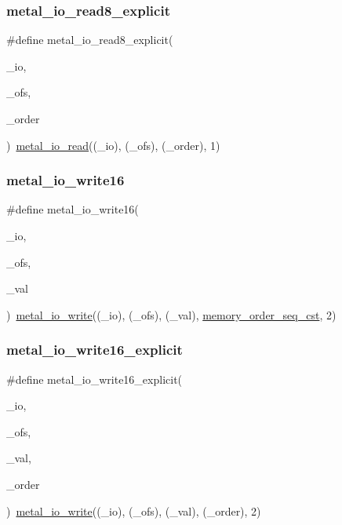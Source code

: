 \subsubsection{\texorpdfstring{metal\+\_\+io\+\_\+read8\+\_\+explicit}{metal\_io\_read8\_explicit}}
{\footnotesize\ttfamily \#define metal\+\_\+io\+\_\+read8\+\_\+explicit(\begin{DoxyParamCaption}\item[{}]{\+\_\+io,  }\item[{}]{\+\_\+ofs,  }\item[{}]{\+\_\+order }\end{DoxyParamCaption})~\hyperlink{group__io_ga0cd8707fcac0d892726f1e946186c531}{metal\+\_\+io\+\_\+read}((\+\_\+io), (\+\_\+ofs), (\+\_\+order), 1)}

\mbox{\label{group__io_gab8016df69fa1998ac33c21a80e59c877}} 
\subsubsection{\texorpdfstring{metal\+\_\+io\+\_\+write16}{metal\_io\_write16}}
{\footnotesize\ttfamily \#define metal\+\_\+io\+\_\+write16(\begin{DoxyParamCaption}\item[{}]{\+\_\+io,  }\item[{}]{\+\_\+ofs,  }\item[{}]{\+\_\+val }\end{DoxyParamCaption})~\hyperlink{group__io_ga74ef56cd9b16bced8c2b8553956220b4}{metal\+\_\+io\+\_\+write}((\+\_\+io), (\+\_\+ofs), (\+\_\+val), \hyperlink{compiler_2gcc_2atomic_8h_a17c2de5ae768960284c047a320f17d1ba2d21914d1edd227a890107e7878a3752}{memory\+\_\+order\+\_\+seq\+\_\+cst}, 2)}

\mbox{\label{group__io_ga57b9502dd632058ede3394c9910a144f}} 
\subsubsection{\texorpdfstring{metal\+\_\+io\+\_\+write16\+\_\+explicit}{metal\_io\_write16\_explicit}}
{\footnotesize\ttfamily \#define metal\+\_\+io\+\_\+write16\+\_\+explicit(\begin{DoxyParamCaption}\item[{}]{\+\_\+io,  }\item[{}]{\+\_\+ofs,  }\item[{}]{\+\_\+val,  }\item[{}]{\+\_\+order }\end{DoxyParamCaption})~\hyperlink{group__io_ga74ef56cd9b16bced8c2b8553956220b4}{metal\+\_\+io\+\_\+write}((\+\_\+io), (\+\_\+ofs), (\+\_\+val), (\+\_\+order), 2)}

